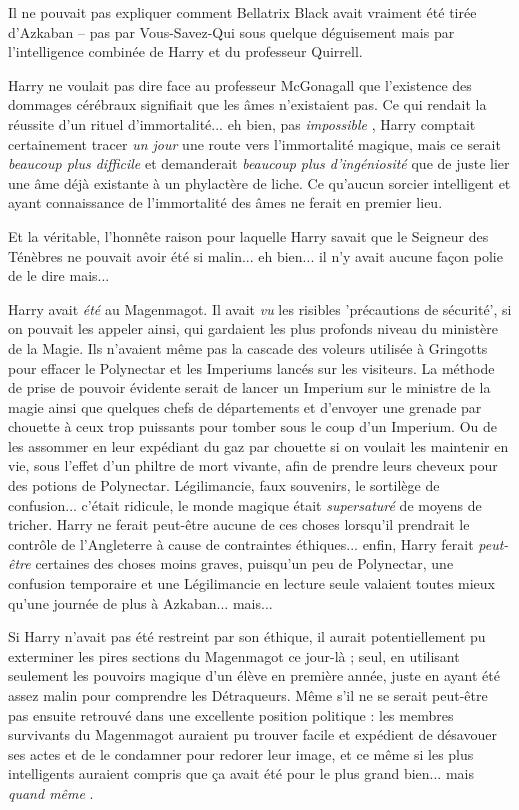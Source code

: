 Il ne pouvait pas expliquer comment Bellatrix Black avait vraiment été tirée d'Azkaban – pas par Vous-Savez-Qui sous quelque déguisement mais par l'intelligence combinée de Harry et du professeur Quirrell.

Harry ne voulait pas dire face au professeur McGonagall que l'existence des dommages cérébraux signifiait que les âmes n'existaient pas. Ce qui rendait la réussite d'un rituel d'immortalité... eh bien, pas \emph{impossible} , Harry comptait certainement tracer \emph{un jour } une route vers l'immortalité magique, mais ce serait \emph{beaucoup plus difficile}  et demanderait \emph{beaucoup plus d'ingéniosité } que de juste lier une âme déjà existante à un phylactère de liche. Ce qu'aucun sorcier intelligent et ayant connaissance de l'immortalité des âmes ne ferait en premier lieu.

Et la véritable, l'honnête raison pour laquelle Harry savait que le Seigneur des Ténèbres ne pouvait avoir été si malin... eh bien... il n'y avait aucune façon polie de le dire mais...

Harry avait \emph{été}  au Magenmagot. Il avait \emph{vu}  les risibles 'précautions de sécurité', si on pouvait les appeler ainsi, qui gardaient les plus profonds niveau du ministère de la Magie. Ils n'avaient même pas la cascade des voleurs utilisée à Gringotts pour effacer le Polynectar et les Imperiums lancés sur les visiteurs. La méthode de prise de pouvoir évidente serait de lancer un Imperium sur le ministre de la magie ainsi que quelques chefs de départements et d'envoyer une grenade par chouette à ceux trop puissants pour tomber sous le coup d'un Imperium. Ou de les assommer en leur expédiant du gaz par chouette si on voulait les maintenir en vie, sous l'effet d'un philtre de mort vivante, afin de prendre leurs cheveux pour des potions de Polynectar. Légilimancie, faux souvenirs, le sortilège de confusion... c'était ridicule, le monde magique était \emph{supersaturé}  de moyens de tricher. Harry ne ferait peut-être aucune de ces choses lorsqu'il prendrait le contrôle de l'Angleterre à cause de contraintes éthiques... enfin, Harry ferait \emph{peut-être}  certaines des choses moins graves, puisqu'un peu de Polynectar, une confusion temporaire et une Légilimancie en lecture seule valaient toutes mieux qu'une journée de plus à Azkaban... mais...

Si Harry n'avait pas été restreint par son éthique, il aurait potentiellement pu exterminer les pires sections du Magenmagot ce jour-là ; seul, en utilisant seulement les pouvoirs magique d'un élève en première année, juste en ayant été assez malin pour comprendre les Détraqueurs. Même s'il ne se serait peut-être pas ensuite retrouvé dans une excellente position politique : les membres survivants du Magenmagot auraient pu trouver facile et expédient de désavouer ses actes et de le condamner pour redorer leur image, et ce même si les plus intelligents auraient compris que ça avait été pour le plus grand bien... mais \emph{quand même} .

